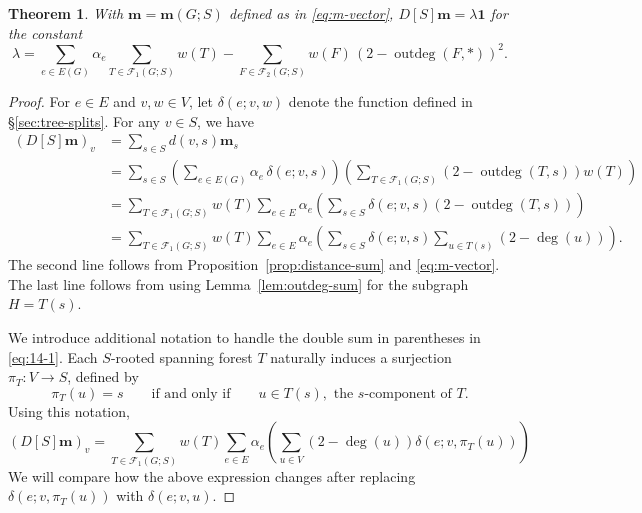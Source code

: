 \documentclass[12pt]{amsart}
\newtheorem{thm}{Theorem}[section]
\theoremstyle{definition}
\newcommand{\bone}{\mathbf{1}}
\newcommand{\boldm}{\mathbf{m}}
\newcommand{\trees}{\mathcal{F}_1}
\newcommand{\forests}{\mathcal{F}}
\DeclareMathOperator{\outdeg}{outdeg}
\begin{document}
\begin{thm}
\label{thm:m-distance-product}
With $\boldm = \boldm(G;S)$ defined as in \eqref{eq:m-vector},
$D[S] \boldm = \lambda \bone$
for the constant
\begin{equation}
\label{eq:lambda}
	\lambda = \sum_{e \in E(G)} \alpha_e \sum_{T\in \trees(G;S)} w({T}) - \sum_{F \in \forests_2(G;S)} w({F}) \, (2 - \outdeg(F,*))^2.
\end{equation}
\end{thm}

\begin{proof}
For $e\in E$ and $v,w\in V$, let $\delta(e;v,w)$ denote the function defined in \S\ref{sec:tree-splits}.
For any $v \in S$, we have
\begin{align}
  (D[S] \boldm)_v &= \sum_{s \in S} d(v,s) \boldm_s \\
  &= \sum_{s \in S} \left( \sum_{e \in E(G)} \alpha_e\, \delta(e; v,s) \right) \left( \sum_{T \in \trees(G;S)} (2 - \outdeg(T,s)) w({T}) \right) \\
  &= \sum_{T\in \trees(G;S)} w({T}) \sum_{e\in E} \alpha_e \left( \sum_{s \in S} \delta(e; v,s) (2 - \outdeg(T, s)) \right) \\
  &= \sum_{T \in \trees(G;S)} w({T}) \sum_{e \in E} \alpha_e \left( \sum_{s \in S} \delta(e; v,s) \sum_{u \in T(s)} (2 - \deg(u)) \right). \label{eq:14-1}
\end{align}
The second line follows from Proposition~\ref{prop:distance-sum} and \eqref{eq:m-vector}. 
The last line follows from using Lemma~\ref{lem:outdeg-sum} for the subgraph $H = T(s)$.

We introduce additional notation to handle the double sum in parentheses in \eqref{eq:14-1}.
Each $S$-rooted spanning forest $T$ naturally induces a surjection $\pi_T\colon V \to S$, defined by 
\[
	\pi_T(u) = s \qquad\text{if and only if}\qquad u \in T(s), \text{ the $s$-component of $T$}.
\]
Using this notation,
\begin{equation}
\label{eq:9}
	(D[S] \boldm)_v = \sum_{T \in \trees(G;S)} w({T}) \sum_{e \in E} \alpha_e \left( \sum_{u \in V} (2 - \deg(u)) \delta(e; v,\pi_T(u)) \right)
\end{equation}
We will compare how the above expression changes after replacing $\delta(e; v,\pi_T(u))$ with $\delta(e; v, u)$.


\end{proof}
\end{document}
